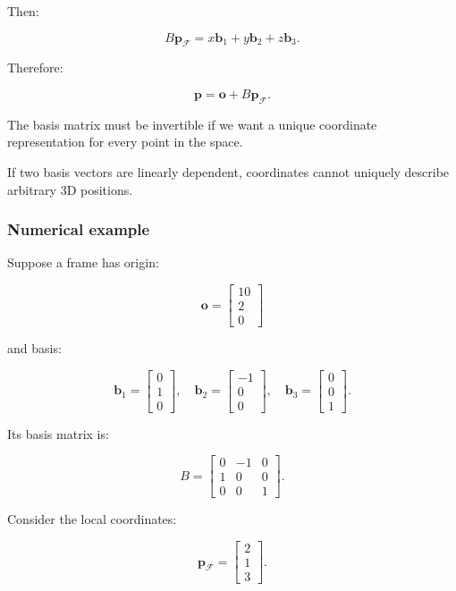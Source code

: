 Then:

\[
 B\mathbf p_{\mathcal F} = x\mathbf b_1+y\mathbf b_2+z\mathbf b_3.
\]

Therefore:

\[
 \boxed{ \mathbf p=\mathbf o+B\mathbf p_{\mathcal F} }.
\]

The basis matrix must be invertible if we want a unique coordinate representation for every point in the space.

If two basis vectors are linearly dependent, coordinates cannot uniquely describe arbitrary 3D positions.

\subsubsection{Numerical example}\label{numerical-example}

Suppose a frame has origin:

\[
 \mathbf o= \begin{bmatrix}10\\2\\0\end{bmatrix}
\]

and basis:

\[
 \mathbf b_1= \begin{bmatrix}0\\1\\0\end{bmatrix},\quad \mathbf b_2= \begin{bmatrix}-1\\0\\0\end{bmatrix},\quad \mathbf b_3= \begin{bmatrix}0\\0\\1\end{bmatrix}.
\]

Its basis matrix is:

\[
 B= \begin{bmatrix} 0&-1&0\\ 1&0&0\\ 0&0&1 \end{bmatrix}.
\]

Consider the local coordinates:

\[
 \mathbf p_{\mathcal F}= \begin{bmatrix}2\\1\\3\end{bmatrix}.
\]

